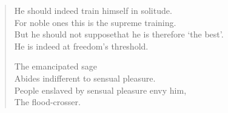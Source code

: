 \begin{verse}
 He should indeed train himself in solitude.\\
For noble ones this is the supreme training.\\
But he should not suppose\newline that he is therefore `the best'.\\
He is indeed at freedom's threshold.


 The emancipated sage\\
Abides indifferent to sensual pleasure.\\
People enslaved by sensual pleasure envy him,\\
The flood-crosser.


\end{verse}
